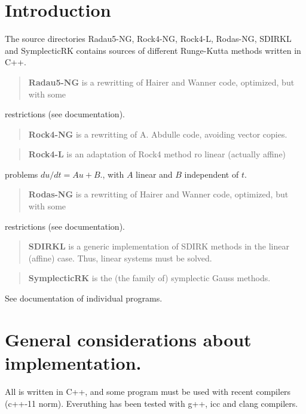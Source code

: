 \hypertarget{index_Introduction}{}\section{Introduction}\label{index_Introduction}
The source directories Radau5-\/\+N\+G, Rock4-\/\+N\+G, Rock4-\/\+L, Rodas-\/\+N\+G, S\+D\+I\+R\+K\+L and Symplectic\+R\+K contains sources of different Runge-\/\+Kutta methods written in C++.

\begin{quote}
{\bfseries  Radau5-\/\+N\+G } is a rewritting of Hairer and Wanner code, optimized, but with some \end{quote}
restrictions (see documentation).

\begin{quote}
{\bfseries  Rock4-\/\+N\+G } is a rewritting of A. Abdulle code, avoiding vector copies. \end{quote}


\begin{quote}
{\bfseries  Rock4-\/\+L } is an adaptation of Rock4 method ro linear (actually affine) \end{quote}
problems $ du/dt= A u +B.$, with $ A $ linear and $ B $ independent of $ t.$

\begin{quote}
{\bfseries  Rodas-\/\+N\+G } is a rewritting of Hairer and Wanner code, optimized, but with some \end{quote}
restrictions (see documentation).

\begin{quote}
{\bfseries  S\+D\+I\+R\+K\+L} is a generic implementation of S\+D\+I\+R\+K methods in the linear (affine) case. Thus, linear systems must be solved. \end{quote}


\begin{quote}
{\bfseries  Symplectic\+R\+K} is the (the family of) symplectic Gauss methods. \end{quote}


See documentation of individual programs.\hypertarget{index_General}{}\section{General considerations about implementation.}\label{index_General}
All is written in C++, and some program must be used with recent compilers (c++-\/11 norm). Everuthing has been tested with g++, icc and clang compilers.

